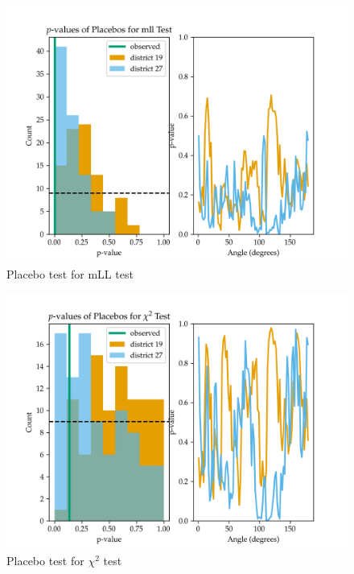 \documentclass[letter]{article}
\makeatletter
\def\maxwidth{\ifdim\Gin@nat@width>\linewidth\linewidth
\else\Gin@nat@width\fi}
\let\Oldincludegraphics\includegraphics
\renewcommand{\includegraphics}[1]{\Oldincludegraphics[width=.8\maxwidth]{#1}}
\makeatother
\begin{document}
\begin{figure}
\centering
\includegraphics{NYC/NYC_plots/placebo_mLL.png}
\caption{Placebo test for mLL test}
\end{figure}

\begin{figure}
\centering
\includegraphics{NYC/NYC_plots/placebo_chi.png}
\caption{Placebo test for \(\chi^2\) test}
\end{figure}
\end{document}
